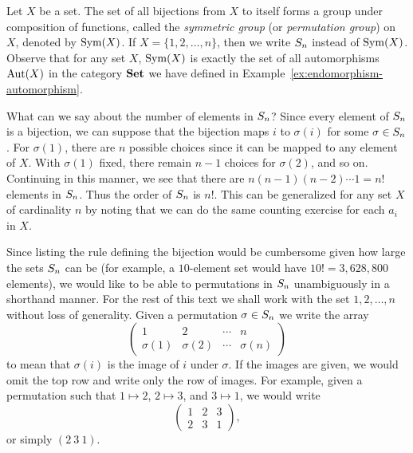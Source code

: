 \begin{example}
    \label{ex:symmetric-group}
    Let \(X\) be a set. The set of all bijections from \(X\) to itself forms a
    group under composition of functions, called the \emph{symmetric group} (or
    \emph{permutation group}) on \(X\), denoted by \(\operatorname{Sym}(X)\). If \(X = \{1, 2,
    \ldots, n\}\), then we write \(S_{n}\) instead of \(\operatorname{Sym}(X)\). Observe
    that for any set \(X\), \(\operatorname{Sym}(X)\) is exactly the set of all automorphisms
    \(\operatorname{Aut}(X)\) in the category \(\mathbf{Set}\) we have defined in
    Example~\ref{ex:endomorphism-automorphism}.

    What can we say about the number of elements in \(S_{n}\)? Since every
    element of \(S_{n}\) is a bijection, we can suppose that the bijection
    maps \(i\) to \(\sigma(i)\) for some \(\sigma \in S_{n}\). For
    \(\sigma(1)\), there are \(n\) possible choices since it can be mapped to
    any element of \(X\). With \(\sigma(1)\) fixed, there remain \(n-1\) choices
    for \(\sigma(2)\), and so on. Continuing in this manner, we see that there
    are \(n(n - 1)(n - 2) \cdots 1 = n!\) elements in \(S_{n}\). Thus the
    order of \(S_{n}\) is \(n!\). This can be generalized for any set \(X\)
    of cardinality \(n\) by noting that we can do the same counting exercise for
    each \(a_i\) in \(X\).

    Since listing the rule defining the bijection would be cumbersome given how
    large the sets \(S_{n}\) can be (for example, a \(10\)-element set would
    have \(10! = 3,628,800\) elements), we would like to be able to permutations
    in \(S_{n}\) unambiguously in a shorthand manner. For the rest of this
    text we shall work with the set \({1, 2, \ldots, n}\) without loss of
    generality. Given a permutation \(\sigma \in S_{n}\) we write the array
    \[
        \begin{pmatrix}
            1 & 2 & \cdots & n\\
            \sigma(1) & \sigma(2) & \cdots & \sigma(n)
        \end{pmatrix}
    \]
    to mean that \(\sigma(i)\) is the image of \(i\) under \(\sigma\). If the
    images are given, we would omit the top row and write only the row of
    images. For example, given a permutation such that \(1 \mapsto 2\), \(2
    \mapsto 3\), and \(3 \mapsto 1\), we would write
    \[
        \begin{pmatrix}
            1 & 2 & 3\\
            2 & 3 & 1
        \end{pmatrix},
    \]
    or simply \((2\ 3\ 1)\).


\end{example}
